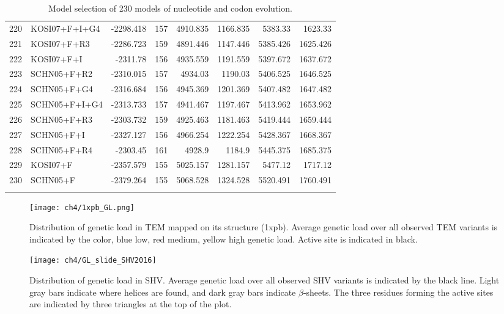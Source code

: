 \begin{longtable}{clrrrrrr}
	220 & KOSI07+F+I+G4 & -2298.418 & 157 & 4910.835 & 1166.835 & 5383.33 & 1623.33 \\ 
	221 & KOSI07+F+R3 & -2286.723 & 159 & 4891.446 & 1147.446 & 5385.426 & 1625.426 \\ 
	222 & KOSI07+F+I & -2311.78 & 156 & 4935.559 & 1191.559 & 5397.672 & 1637.672 \\ 
	223 & SCHN05+F+R2 & -2310.015 & 157 & 4934.03 & 1190.03 & 5406.525 & 1646.525 \\ 
	224 & SCHN05+F+G4 & -2316.684 & 156 & 4945.369 & 1201.369 & 5407.482 & 1647.482 \\ 
	225 & SCHN05+F+I+G4 & -2313.733 & 157 & 4941.467 & 1197.467 & 5413.962 & 1653.962 \\ 
	226 & SCHN05+F+R3 & -2303.732 & 159 & 4925.463 & 1181.463 & 5419.444 & 1659.444 \\ 
	227 & SCHN05+F+I & -2327.127 & 156 & 4966.254 & 1222.254 & 5428.367 & 1668.367 \\ 
	228 & SCHN05+F+R4 & -2303.45 & 161 & 4928.9 & 1184.9 & 5445.375 & 1685.375 \\ 
	229 & KOSI07+F & -2357.579 & 155 & 5025.157 & 1281.157 & 5477.12 & 1717.12 \\ 
	230 & SCHN05+F & -2379.264 & 155 & 5068.528 & 1324.528 & 5520.491 & 1760.491 \\ 
  \caption{Model selection of 230 models of nucleotide and codon evolution.}
  \label{tab:AIC_full}
\end{longtable}



\begin{figure}[H]
     \centering
	\texttt{[image: ch4/1xpb\_GL.png]}
	\caption{Distribution of genetic load in TEM mapped on its structure (1xpb). 
	Average genetic load over all observed TEM variants is indicated by the color, blue low, red medium, yellow high genetic load. Active site is indicated in black.}
	\label{fig:tem2016_3d}
\end{figure}


\begin{figure}[H]
     \centering
	\texttt{[image: ch4/GL\_slide\_SHV2016]}
	\caption{Distribution of genetic load in SHV. 
	Average genetic load over all observed SHV variants is indicated by the black line. 
	Light gray bars indicate where helices are found, and dark gray bars indicate $\beta$-sheets.
	The three residues forming the active sites are indicated by three triangles at the top of the plot.}
	\label{fig:shv2016_sse}
\end{figure}

